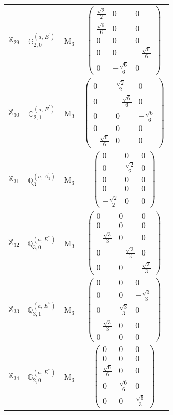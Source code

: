 \documentclass[fleqn,10pt,landscape]{article}
\begin{document}
\begin{itemize}
\begin{center}
\begin{longtable}{c|c|c|c}
$ \mathbb{X}_{29} $ & $\mathbb{G}_{2,0}^{(a,E^{\prime})}$ & M$_{3}$ & $\begin{pmatrix} \frac{\sqrt{2}}{2} & 0 & 0 \\ \frac{\sqrt{6}}{6} & 0 & 0 \\ 0 & 0 & 0 \\ 0 & 0 & - \frac{\sqrt{6}}{6} \\ 0 & - \frac{\sqrt{6}}{6} & 0 \end{pmatrix}$ \\
$ \mathbb{X}_{30} $ & $\mathbb{G}_{2,1}^{(a,E^{\prime})}$ & M$_{3}$ & $\begin{pmatrix} 0 & \frac{\sqrt{2}}{2} & 0 \\ 0 & - \frac{\sqrt{6}}{6} & 0 \\ 0 & 0 & - \frac{\sqrt{6}}{6} \\ 0 & 0 & 0 \\ - \frac{\sqrt{6}}{6} & 0 & 0 \end{pmatrix}$ \\
$ \mathbb{X}_{31} $ & $\mathbb{Q}_{3}^{(a,A_{1}^{\prime})}$ & M$_{3}$ & $\begin{pmatrix} 0 & 0 & 0 \\ 0 & \frac{\sqrt{2}}{2} & 0 \\ 0 & 0 & 0 \\ 0 & 0 & 0 \\ - \frac{\sqrt{2}}{2} & 0 & 0 \end{pmatrix}$ \\
$ \mathbb{X}_{32} $ & $\mathbb{Q}_{3,0}^{(a,E^{\prime\prime})}$ & M$_{3}$ & $\begin{pmatrix} 0 & 0 & 0 \\ 0 & 0 & 0 \\ - \frac{\sqrt{3}}{3} & 0 & 0 \\ 0 & - \frac{\sqrt{3}}{3} & 0 \\ 0 & 0 & \frac{\sqrt{3}}{3} \end{pmatrix}$ \\
$ \mathbb{X}_{33} $ & $\mathbb{Q}_{3,1}^{(a,E^{\prime\prime})}$ & M$_{3}$ & $\begin{pmatrix} 0 & 0 & 0 \\ 0 & 0 & - \frac{\sqrt{3}}{3} \\ 0 & \frac{\sqrt{3}}{3} & 0 \\ - \frac{\sqrt{3}}{3} & 0 & 0 \\ 0 & 0 & 0 \end{pmatrix}$ \\
$ \mathbb{X}_{34} $ & $\mathbb{G}_{2,0}^{(a,E^{\prime\prime})}$ & M$_{3}$ & $\begin{pmatrix} 0 & 0 & 0 \\ 0 & 0 & 0 \\ \frac{\sqrt{6}}{6} & 0 & 0 \\ 0 & \frac{\sqrt{6}}{6} & 0 \\ 0 & 0 & \frac{\sqrt{6}}{3} \end{pmatrix}$ \\

\end{longtable}
\end{center}
\end{itemize}
\end{document}
